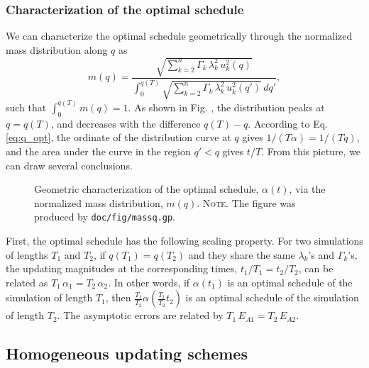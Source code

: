 \documentclass[reprint, floatfix]{revtex4-1}
\newcommand{\note}[1]{{\color{DarkGreen}\footnotesize \textsc{Note.} #1}}
\begin{document}
\subsubsection{\label{sec:mass_distr}
Characterization of the optimal schedule}



We can characterize the optimal schedule
geometrically
through the normalized mass distribution
along $q$ as
\begin{equation}
  m(q)
  =
  \frac{
    \sqrt{
      \sum_{k = 2}^n \Gamma_k \, \lambda_k^2 \, u_k^2(q)
    }
  }
  {
    \int_0^{ q(T) }
      \sqrt{
        \sum_{k = 2}^n \Gamma_k \, \lambda_k^2 \, u_k^2(q')
      }
      \, d q'
  }
  ,
\label{eq:mass_distr}
\end{equation}
%
such that
$\int_0^{q(T)} m(q) = 1$.
%
As shown in Fig. ,
the distribution peaks at $q = q(T)$,
and decreases with the difference $q(T) - q$.
%
According to Eq. \eqref{eq:q_opt},
the ordinate of the distribution curve at $q$
gives $1/(T\alpha) = 1/(T \dot q)$,
and the area under the curve in the region $q' < q$
gives $t/T$.
%
From this picture, we can draw several conclusions.


\begin{figure}[h]
\begin{center}
  \caption{
    \label{fig:massq}
    Geometric characterization of the optimal schedule,
    $\alpha(t)$,
    via the normalized mass distribution, $m(q)$.
    \note{The figure was produced by \texttt{doc/fig/massq.gp}.
    }%
  }
\end{center}
\end{figure}


First,
the optimal schedule has the following scaling property.
%
For two simulations of lengths $T_1$ and $T_2$,
if $q(T_1) = q(T_2)$
and they share the same $\lambda_k$'s and $\Gamma_k$'s,
the updating magnitudes at the corresponding times,
$t_1/T_1 = t_2/T_2$,
can be related as $T_1 \, \alpha_1 = T_2 \, \alpha_2$.
%
In other words,
if $\alpha(t_1)$ is
an optimal schedule of the simulation of length $T_1$,
then
$\frac{T_1}{T_2} \alpha\left( \frac{ T_1 } { T_2 } t_2 \right)$
is an optimal schedule of the simulation of length $T_2$.
%
The asymptotic errors are related by
$T_1 \, E_{A1} = T_2 \, E_{A2}$.



\subsection{\label{sec:band-matrix}
Homogeneous updating schemes}
\end{document}
